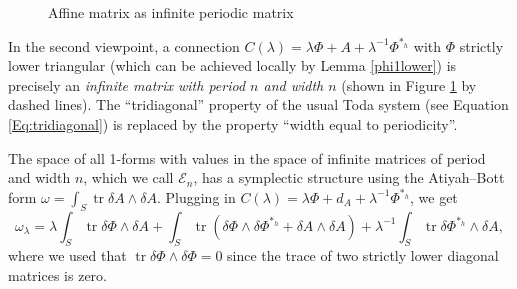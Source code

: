 \documentclass[11pt]{amsart}
\numberwithin{thm}{section} %
\numberwithin{equation}{section} %
\numberwithin{figure}{section} %
\renewcommand*{\l}{\lambda}
\DeclareMathOperator{\tr}{tr}
\begin{document}
\begin{figure}[h]
\centering

\caption{Affine matrix as infinite periodic matrix}
\label{affine-matrix}
\end{figure}

In the second viewpoint, a connection $C(\l)=\l\Phi+A+\l^{-1}\Phi^{*_h}$ with $\Phi$ strictly lower triangular (which can be achieved locally by Lemma \ref{phi1lower}) is precisely an \emph{infinite matrix with period $n$ and width $n$} (shown in Figure \ref{affine-matrix} by dashed lines). The ``tridiagonal'' property of the usual Toda system (see Equation \eqref{Eq:tridiagonal}) is replaced by the property ``width equal to periodicity''. 

The space of all 1-forms with values in the space of infinite matrices of period and width $n$, which we call $\mathcal{E}_n$, has a symplectic structure using the Atiyah--Bott form $ \omega=\int_S\tr \delta A\wedge\delta A$. Plugging in $C(\l)=\l\Phi+d_A+\l^{-1}\Phi^{*_h}$, we get
$$\omega_\l=\l\int_S\tr\delta\Phi\wedge\delta A+\int_S\tr(\delta\Phi\wedge\delta\Phi^{*_h}+\delta A\wedge\delta A)+\l^{-1}\int_S\tr\delta\Phi^{*_h}\wedge\delta A,$$
where we used that $\tr\delta\Phi\wedge\delta\Phi=0$ since the trace of two strictly lower diagonal matrices is zero.
\end{document}
